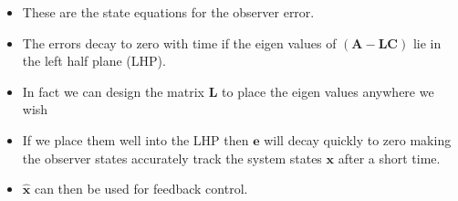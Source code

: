 \begin{itemize}
	\item These are the state equations for the observer error.
	\item The errors decay to zero with time if the eigen values of  $(\mathbf{A}-\mathbf{LC})$ lie in the left half plane (LHP).
	\item In fact we can design the matrix $\mathbf{L}$ to place the eigen values anywhere we wish
	\item If we place them well into the LHP then $\mathbf{e}$ will decay quickly to zero making the observer states accurately track the system states $\mathbf{x}$ after a short time.
	\item $\hat{\mathbf{x}}$ can then be used for feedback control.
\end{itemize}


\endinput

